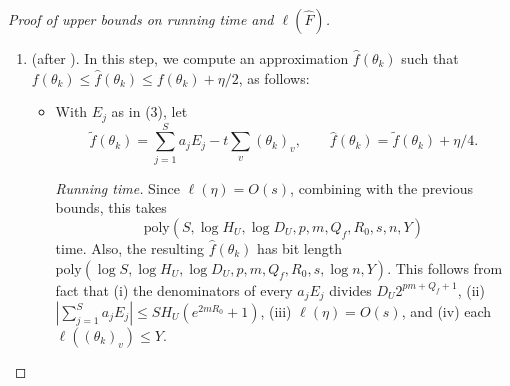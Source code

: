 \documentclass[11pt,reqno,letterpaper]{amsart}
\numberwithin{equation}{section}
\theoremstyle{definition}
\theoremstyle{remark}
\begin{document}
\begin{proof}[Proof of upper bounds on running time and $\ell(\widehat F)$]
\begin{enumerate}[leftmargin=*]
\begin{itemize}[leftmargin=*]
\textit{Running time.} Since $0\leq (b_j)_v\leq m$ are integers, $\ell((\theta_k)_v)\leq Y$, and $|b_j\cdot \theta_k|\leq 2mR_0$, we know from \cref{lem:exponential-enclosures} that this takes $\text{poly}(S,m,R_0,Y,Q_f)$ time. Furthermore, we have $\ell(E_j)=\text{poly}(Q_f,m,R_0)$.

\item For every $v$, compute the rational number
 $\overline g_k (v)=\sum_{j=1}^S a_j(b_j)_vE_j-t$.

\textit{Running time.} Recall from \cref{obs:U-coeffs} that $\ell(a_j)\leq \text{poly}(\log H_U,\log D_U,p,m)$ and  $\ell((b_j)_v) = O(\log(m+1))$. Also recall that $\ell(t)=O(s)$. Combining with the previous bound on $\ell(E_j)$, we know that this takes $$\text{poly}(S,\log H_U,\log D_U,p,m,Q_f,R_0,s)$$ time. 
 Also, the resulting $\overline g_k$  has $\ell(\overline g_k(v))=\text{poly}(\log S,\log H_U,\log D_U,p,m,Q_f,R_0,s)$ pointwise.

\item As before, round $\overline g_k$ to the nearest dyadic vector $\widetilde g_k\in (2^{-P-1}\mathbb Z)^{2n}$, with $|\widetilde g_k(v)-\overline g_k(v)|\leq 2^{-P}\leq\epsilon_0$.


\textit{Running time.} This takes $\text{poly}(\log S,\log H_U,\log D_U,p,m,Q_f,R_0,s,P)$ time.
    \end{itemize}

\noindent \textit{Correctness.} Since $|a_j|\le H_U$,  $(b_j)_v\le m$, and $|E_j-e^{b_j\cdot\theta_k}|\leq\omega_2$, we have
\[
 \left|\overline g_k(v)-\frac{\partial f}{\partial\theta_v}(\theta_k)\right|
 \le mSH_U\omega_2=\epsilon_0/2,
\]
which gives $\|\overline g_k-\nabla f(\theta_k)\|_2\leq \sqrt{2n}\cdot \epsilon_0/2$. Together with  $\|\widetilde g_k-\overline g_k\|_2\leq \sqrt{2n}\cdot\epsilon_0$, this gives $\|\widetilde g_k-\nabla f(\theta_k)\|_2\leq 4\sqrt{n}\epsilon_0\leq\frac{\eta}{16nR_0}$.

    \item {} (after ). In this step,  we compute an   approximation 
$\widehat f(\theta_k)$  such that $f(\theta_k)\leq \widehat f(\theta_k)\leq f(\theta_k)+\eta/2$, as follows:
\begin{itemize}[leftmargin=*]
    \item With $E_j$ as in (3), let
    \[
 \widetilde f(\theta_k)=\sum_{j=1}^S a_jE_j-t\sum_v(\theta_k)_v,
 \qquad
 \widehat f(\theta_k)=\widetilde f(\theta_k)+\eta/4.
\]

\textit{Running time.} Since  $\ell(\eta)=O(s)$, combining with the previous bounds, this takes $$\text{poly}(S,\log H_U,\log D_U,p,m,Q_f,R_0,s,n,Y)$$ time. Also, the resulting $\widehat f(\theta_k)$ has bit length $\text{poly}(\log S,\log H_U,\log D_U,p,m,Q_f,R_0,s,\log n,Y)$. This follows from fact that (i) the denominators of every $a_jE_j$ divides $D_U2^{pm+Q_f+1}$, (ii)  $|\sum_{j=1}^Sa_jE_j|\leq SH_U(e^{2mR_0}+1)$, (iii) $\ell(\eta)=O(s)$, and (iv) each $\ell((\theta_k)_v)\leq Y$.


\end{itemize}
\end{enumerate}
\end{proof}
\end{document}
